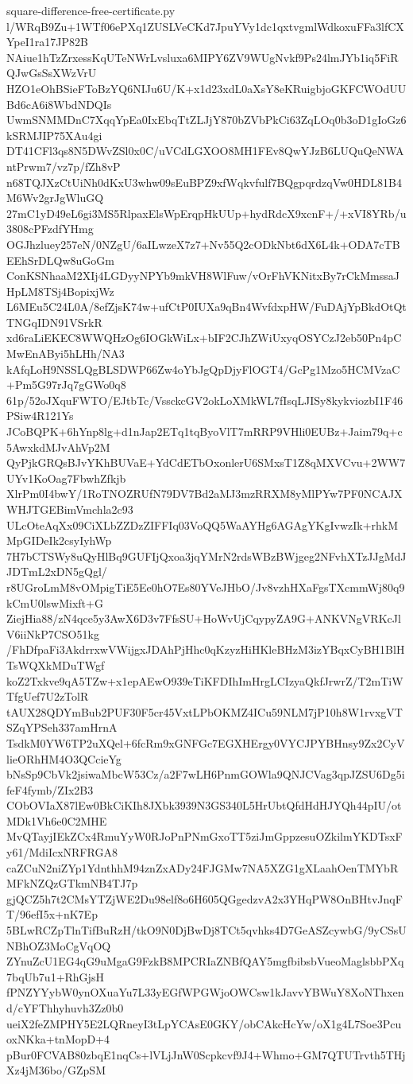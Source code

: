 \documentclass[11pt]{article}
\theoremstyle{definition}
\theoremstyle{remark}
\begin{document}
\begin{filecontents*}[overwrite]{square-difference-free-certificate.py}
l/WRqB9Zu+1WTf06ePXq1ZUSLVeCKd7JpuYVy1dc1qxtvgmlWdkoxuFFa3lfCXYpeI1ra17JP82B
NAiue1hTzZrxessKqUTeNWrLvsluxa6MIPY6ZV9WUgNvkf9Ps24lmJYb1iq5FiRQJwGsSsXWzVrU
HZO1eOhBSieFToBzYQ6NIJu6U/K+x1d23xdL0aXsY8eKRuigbjoGKFCWOdUUBd6cA6i8WbdNDQIs
UwmSNMMDnC7XqqYpEa0IxEbqTtZLJjY870bZVbPkCi63ZqLOq0b3oD1gIoGz6kSRMJIP75XAu4gi
DT41CFl3qs8N5DWvZSl0x0C/uVCdLGXOO8MH1FEv8QwYJzB6LUQuQeNWAntPrwm7/vz7p/fZh8vP
n68TQJXzCtUiNh0dKxU3whw09sEuBPZ9xfWqkvfulf7BQgpqrdzqVw0HDL81B4M6Wv2grJgWluGQ
27mC1yD49eL6gi3MS5RlpaxElsWpErqpHkUUp+hydRdcX9xcnF+/+xVI8YRb/u3808cPFzdfYHmg
OGJhzluey257eN/0NZgU/6aILwzeX7z7+Nv55Q2cODkNbt6dX6L4k+ODA7cTBEEhSrDLQw8uGoGm
ConKSNhaaM2XIj4LGDyyNPYb9mkVH8WlFuw/vOrFhVKNitxBy7rCkMmssaJHpLM8TSj4BopixjWz
L6MEu5C24L0A/8efZjsK74w+ufCtP0IUXa9qBn4WvfdxpHW/FuDAjYpBkdOtQtTNGqIDN91VSrkR
xd6raLiEKEC8WWQHzOg6IOGkWiLx+bIF2CJhZWiUxyqOSYCzJ2eb50Pn4pCMwEnAByi5hLHh/NA3
kAfqLoH9NSSLQgBLSDWP66Zw4oYbJgQpDjyFlOGT4/GcPg1Mzo5HCMVzaC+Pm5G97rJq7gGWo0q8
61p/52oJXquFWTO/EJtbTc/VssckcGV2okLoXMkWL7fIsqLJISy8kykviozbI1F46PSiw4R121Ys
JCoBQPK+6hYnp8lg+d1nJap2ETq1tqByoVlT7mRRP9VHli0EUBz+Jaim79q+c5AwxkdMJvAhVp2M
QyPjkGRQsBJvYKhBUVaE+YdCdETbOxonlerU6SMxsT1Z8qMXVCvu+2WW7UYv1KoOag7FbwhZfkjb
XlrPm0I4bwY/1RoTNOZRUfN79DV7Bd2aMJ3mzRRXM8yMlPYw7PF0NCAJXWHJTGEBimVmchla2c93
ULcOteAqXx09CiXLbZZDzZIFFIq03VoQQ5WaAYHg6AGAgYKgIvwzIk+rhkMMpGIDeIk2csyIyhWp
7H7bCTSWy8uQyHlBq9GUFIjQxoa3jqYMrN2rdsWBzBWjgeg2NFvhXTzJJgMdJJDTmL2xDN5gQgl/
r8UGroLmM8vOMpigTiE5Ee0hO7Es80YVeJHbO/Jv8vzhHXaFgsTXcmmWj80q9kCmU0lswMixft+G
ZiejHia88/zN4qce5y3AwX6D3v7FfsSU+HoWvUjCqypyZA9G+ANKVNgVRKcJlV6iiNkP7CSO51kg
/FhDfpaFi3AkdrrxwVWijgxJDAhPjHhc0qKzyzHiHKleBHzM3izYBqxCyBH1BlHTsWQXkMDuTWgf
koZ2Txkve9qA5TZw+x1epAEwO939eTiKFDIhImHrgLCIzyaQkfJrwrZ/T2mTiWTfgUef7U2zTolR
tAUX28QDYmBub2PUF30F5cr45VxtLPbOKMZ4ICu59NLM7jP10h8W1rvxgVTSZqYPSeh337amHrnA
TsdkM0YW6TP2uXQel+6fcRm9xGNFGc7EGXHErgy0VYCJPYBHnsy9Zx2CyVlieORhHM4O3QCcieYg
bNsSp9CbVk2jsiwaMbcW53Cz/a2F7wLH6PnmGOWla9QNJCVag3qpJZSU6Dg5ifeF4fymb/ZIx2B3
CObOVIaX87lEw0BkCiKIh8JXbk3939N3GS340L5HrUbtQfdHdHJYQh44pIU/otMDk1Vh6e0C2MHE
MvQTayjIEkZCx4RmuYyW0RJoPnPNmGxoTT5ziJmGppzesuOZkilmYKDTsxFy61/MdiIcxNRFRGA8
caZCuN2niZYp1YdnthhM94znZxADy24FJGMw7NA5XZG1gXLaahOenTMYbRMFkNZQzGTkmNB4TJ7p
gjQCZ5h7t2CMsYTZjWE2Du98elf8o6H605QGgedzvA2x3YHqPW8OnBHtvJnqFT/96efI5x+nK7Ep
5BLwRCZpTlnTifBuRzH/tkO9N0DjBwDj8TCt5qvhks4D7GeASZcywbG/9yCSsUNBhOZ3MoCgVqOQ
ZYnuZcU1EG4qG9uMgaG9FzkB8MPCRIaZNBfQAY5mgfbibsbVueoMaglsbbPXq7bqUb7u1+RhGjsH
fPNZYYybW0ynOXuaYu7L33yEGfWPGWjoOWCsw1kJavvYBWuY8XoNThxend/cYFThhyhuvh3Zz0b0
ueiX2feZMPHY5E2LQRneyI3tLpYCAsE0GKY/obCAkcHcYw/oX1g4L7Soe3PcuoxNKka+tnMopD+4
pBur0FCVAB80zbqE1nqCs+lVLjJnW0Scpkcvf9J4+Whmo+GM7QTUTrvth5THjXz4jM36bo/GZpSM

\end{filecontents*}
\end{document}
